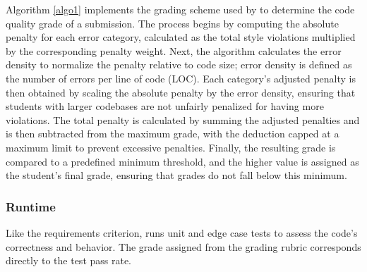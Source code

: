 
Algorithm \ref{algo1} implements the grading scheme used by \codeinspector to determine the code quality grade of a submission. The process begins by computing the absolute penalty for each error category, calculated as the total style violations multiplied by the corresponding penalty weight. Next, the algorithm calculates the error density to normalize the penalty relative to code size; error density is defined as the number of errors per line of code (LOC). Each category’s adjusted penalty is then obtained by scaling the absolute penalty by the error density, ensuring that students with larger codebases are not unfairly penalized for having more violations. The total penalty is calculated by summing the adjusted penalties and is then subtracted from the maximum grade, with the deduction capped at a maximum limit to prevent excessive penalties. Finally, the resulting grade is compared to a predefined minimum threshold, and the higher value is assigned as the student’s final grade, ensuring that grades do not fall below this minimum.

\subsubsection{Runtime}
Like the requirements criterion, \codeinspector runs unit and edge case tests to assess the code’s correctness and behavior. The grade assigned from the grading rubric corresponds directly to the test pass rate.